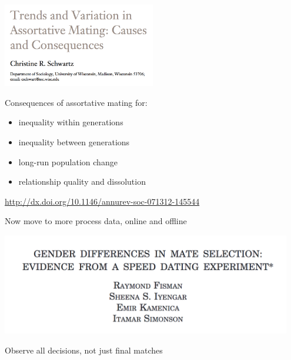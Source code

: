 \documentclass[aspectratio=169]{beamer}
\begin{document}
\begin{frame}

\begin{center}
\includegraphics[width=0.5\textwidth]{figures/schwartz_trends_2013_title}
\end{center}

Consequences of assortative mating for:
\begin{itemize}
\item inequality within generations \pause
\item inequality between generations \pause
\item long-run population change \pause
\item relationship quality and dissolution
\end{itemize}

\vfill
\url{http://dx.doi.org/10.1146/annurev-soc-071312-145544}

\end{frame}
\begin{frame}

Now move to more process data, online and offline
\pause

\begin{center}
\includegraphics[width=0.95\textwidth]{figures/fisman_gender_2006_title}
\end{center}

\vfill

Observe all decisions, not just final matches


\end{frame}
\end{document}
